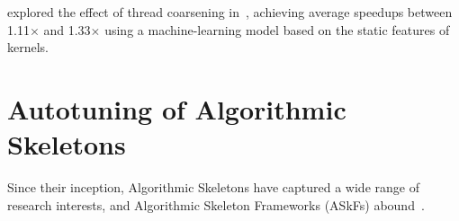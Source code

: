 

\citeauthor{Magni2014} explored the effect of thread coarsening
in~\cite{Magni2014}, achieving average speedups between 1.11$\times$
and 1.33$\times$ using a machine-learning model based on the static
features of kernels.



\section{Autotuning of Algorithmic Skeletons}


Since their inception, Algorithmic Skeletons have captured a wide
range of research interests, and Algorithmic Skeleton Frameworks
(ASkFs) abound~\cite{Gonz2010}.



%
